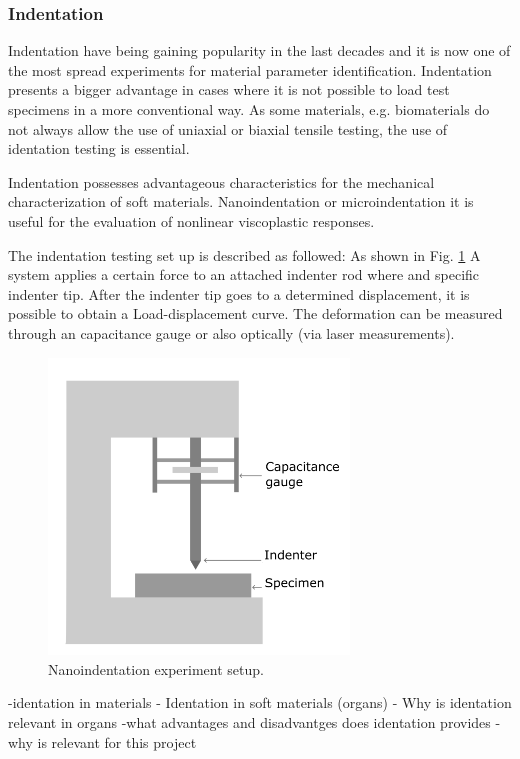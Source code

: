 \subsubsection*{Indentation}
Indentation have being gaining popularity in the last decades and it is now one of
 the most spread experiments for material parameter identification.
 Indentation presents a bigger advantage in cases where it is not possible to load
 test specimens in a more conventional way.\cite{Bergström2015} As some materials, e.g. biomaterials do not always 
 allow the use of uniaxial or biaxial tensile testing, the
 use of identation testing is essential.  

Indentation possesses advantageous characteristics for the mechanical characterization
of soft materials. \cite{Liu2009}
Nanoindentation or microindentation it is useful for the evaluation of
nonlinear viscoplastic responses. \cite{Bergström2015}

The indentation testing set up is described as followed: As shown in Fig. \ref{fig:Nanoindentation} 
A system applies a certain force to an attached indenter rod where and specific 
indenter tip. After the indenter tip goes to a determined displacement, 
it is possible to obtain a Load-displacement curve.
The deformation can be measured through an capacitance gauge \cite{Bergström2015}
or also optically (via laser measurements).

 \begin{figure}[th]
        \centering
        \includegraphics[width=8cm]{Images/nanoindentationbigletter}
        \decoRule
        \caption[Nanoindentation]{Nanoindentation experiment setup.}
        \label{fig:Nanoindentation}
        \end{figure}


-identation in materials
- Identation in soft materials (organs)
- Why is identation relevant in organs
-what advantages and disadvantges does identation provides
-why is relevant for this project 

